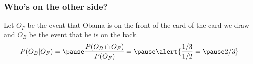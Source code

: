 \documentclass[handout]{beamer}
\begin{document}
\begin{frame}
\frametitle{Who's on the other side?}
Let $O_F$ be the event that Obama is on the front of the card of the card we draw and $O_B$ be the event that he is on the back.\pause
$$P(O_B|O_F) = \pause \frac{P(O_B\cap O_F)}{P(O_F)} = \pause \alert{\frac{1/3}{1/2}= \pause 2/3}$$

\end{frame}


\end{document}
